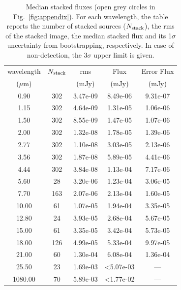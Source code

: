 \begin{table}[!p]
\caption{Median stacked fluxes (open grey circles in Fig.~\ref{fig:appendix}). For each wavelength, the table reports the number of stacked sources ($N_{\rm stack}$), the rms of the stacked image, the median stacked flux and its 1$\sigma$ uncertainty from bootstrapping, respectively. In case of non-detection, the 3$\sigma$ upper limit is given. }
\centering
\begin{tabular}{cc|ccc}
\hline\hline
%
wavelength &  $N$$_{\rm stack}$ &  rms    &  Flux &  Error Flux \\
 ($\mu$m) &                    &  (mJy)    &  (mJy)    &  (mJy)    \\
\hline
0.90 & 302 & 3.47e-09 & 8.49e-06 & 9.31e-07 \\
1.15 & 302 & 4.64e-09 & 1.31e-05 & 1.06e-06 \\
1.50 & 302 & 8.55e-09 & 1.47e-05 & 1.07e-06 \\
2.00 & 302 & 1.32e-08 & 1.78e-05 & 1.39e-06 \\
2.77 & 302 & 1.10e-08 & 3.03e-05 & 2.13e-06 \\
3.56 & 302 & 1.87e-08 & 5.89e-05 & 4.41e-06 \\
4.44 & 302 & 3.84e-08 & 1.13e-04 & 7.17e-06 \\
5.60 & 28 & 3.20e-06 & 1.23e-04 & 3.06e-05 \\
7.70 & 163 & 2.07e-06 & 2.13e-04 & 1.60e-05 \\
10.00 & 61 & 1.07e-05 & 1.94e-04 & 3.35e-05 \\
12.80 & 24 & 3.93e-05 & 2.68e-04 & 5.67e-05 \\
15.00 & 61 & 3.35e-05 & 3.42e-04 & 5.73e-05 \\
18.00 & 126 & 4.99e-05 & 5.33e-04 & 9.97e-05 \\
21.00 & 60 & 1.30e-04 & 6.08e-04 & 1.36e-04 \\
25.50 & 23 & 1.69e-03 & <5.07e-03 & --- \\
1080.00 & 70 & 5.89e-03 & <1.77e-02 & --- \\
%
%
\hline
\hline
\end{tabular} \label{tab:stacks}

\end{table}